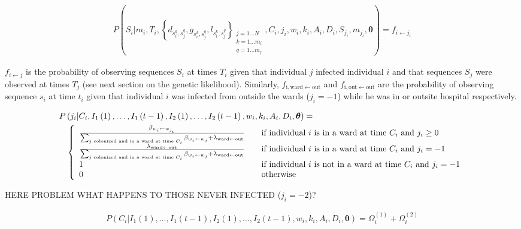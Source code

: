 \documentclass[10pt]{article}
\begin{document}
\begin{eqnarray*}
P\left(S_i|m_i,T_i,\left\{d_{s_i^k,s_j^q},g_{s_i^k,s_j^q},l_{s_i^k,s_j^q}\right\}_{
\substack{j=1\ldots N \\ k=1\ldots m_i \\ q=1\ldots m_j}
},C_i,j_i,w_i,k_i,A_i,D_i,S_{j_i},m_{j_i},\bm{\theta}\right) = f_{i\leftarrow j_i}
\end{eqnarray*}

$f_{i\leftarrow j}$ is the probability of observing sequences $S_i$ at times $T_i$ given that individual $j$ infected individual $i$ and that sequences $S_j$ were observed at times $T_j$ (see next section on the genetic likelihood). 
Similarly, $f_{\text{i},\text{ward} \leftarrow \text{out}}$ and $f_{\text{i},\text{out} \leftarrow \text{out}}$ are the probability of observing sequence $s_i$ at time $t_i$ given that individual $i$ was infected from outside the wards ($j_i = -1$) while he was in or outsite hospital respectively. 

\begin{eqnarray*}
\lefteqn{
P\left(j_i|C_i,I_1\left(1\right),\ldots,I_1\left(t-1\right),I_2\left(1\right),\ldots,I_2\left(t-1\right),w_i,k_i,A_i,D_i,\bm{\theta}\right) = }\\
&& \left\{ 
\begin{array}{l l}
  \frac{\beta_{w_i \leftarrow w_{j_i}} }{\sum_{\text{$j$ colonized and in a ward at time $C_i$}} \beta_{w_i \leftarrow w_j} + \lambda_{\text{ward} \leftarrow \text{out}}} & \quad \mbox{if individual $i$ is in a ward at time $C_i$ and $j_i\geq 0$}\\
  \frac{\lambda_{\text{ward} \leftarrow \text{out} }}{\sum_{\text{$j$ colonized and in a ward at time $C_i$}} \beta_{w_i \leftarrow w_j} + \lambda_{\text{ward} \leftarrow \text{out}}} & \quad \mbox{if individual $i$ is in a ward at time $C_i$ and $j_i=-1$}\\ 
    1 & \quad \mbox{if individual $i$ is not in a ward at time $C_i$ and $j_i=-1$}\\ 
    0 & \quad \mbox{otherwise}\\
\end{array} \right. \\
\end{eqnarray*}

HERE PROBLEM WHAT HAPPENS TO THOSE NEVER INFECTED ($j_i = -2$)? 

\begin{eqnarray*}
P\left(C_i|I_1\left(1\right),\ldots,I_1\left(t-1\right),I_2\left(1\right),\ldots,I_2\left(t-1\right),w_i,k_i,A_i,D_i,\bm{\theta}\right) = \Omega_i^{\left(1\right)} + \Omega_i^{\left(2\right)} 
\end{eqnarray*}
\end{document}
